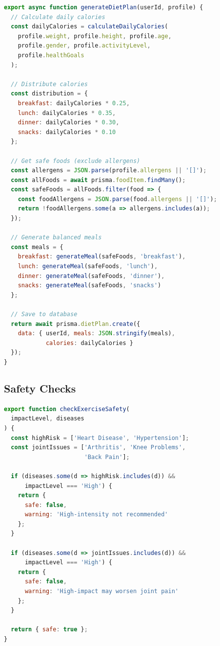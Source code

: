\begin{lstlisting}[language=JavaScript, caption=Diet Plan Generator (Core Logic)]
export async function generateDietPlan(userId, profile) {
  // Calculate daily calories
  const dailyCalories = calculateDailyCalories(
    profile.weight, profile.height, profile.age,
    profile.gender, profile.activityLevel, 
    profile.healthGoals
  );
  
  // Distribute calories
  const distribution = {
    breakfast: dailyCalories * 0.25,
    lunch: dailyCalories * 0.35,
    dinner: dailyCalories * 0.30,
    snacks: dailyCalories * 0.10
  };
  
  // Get safe foods (exclude allergens)
  const allergens = JSON.parse(profile.allergens || '[]');
  const allFoods = await prisma.foodItem.findMany();
  const safeFoods = allFoods.filter(food => {
    const foodAllergens = JSON.parse(food.allergens || '[]');
    return !foodAllergens.some(a => allergens.includes(a));
  });
  
  // Generate balanced meals
  const meals = {
    breakfast: generateMeal(safeFoods, 'breakfast'),
    lunch: generateMeal(safeFoods, 'lunch'),
    dinner: generateMeal(safeFoods, 'dinner'),
    snacks: generateMeal(safeFoods, 'snacks')
  };
  
  // Save to database
  return await prisma.dietPlan.create({
    data: { userId, meals: JSON.stringify(meals), 
            calories: dailyCalories }
  });
}
\end{lstlisting}

\subsection{Safety Checks}

\begin{lstlisting}[language=JavaScript, caption=Exercise Safety Check]
export function checkExerciseSafety(
  impactLevel, diseases
) {
  const highRisk = ['Heart Disease', 'Hypertension'];
  const jointIssues = ['Arthritis', 'Knee Problems', 
                       'Back Pain'];
  
  if (diseases.some(d => highRisk.includes(d)) && 
      impactLevel === 'High') {
    return { 
      safe: false, 
      warning: 'High-intensity not recommended' 
    };
  }
  
  if (diseases.some(d => jointIssues.includes(d)) && 
      impactLevel === 'High') {
    return { 
      safe: false, 
      warning: 'High-impact may worsen joint pain' 
    };
  }
  
  return { safe: true };
}
\end{lstlisting}

